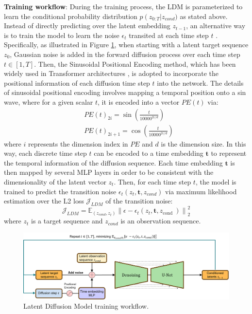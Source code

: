 \documentclass[final-report]{article-template}
\begin{document}
\textbf{Training workflow}: During the training process, the LDM is parameterized to learn the conditional probability distribution $p\left(z_{0: T}\right|z_{cond})$ as stated above. Instead of directly predicting over the latent embedding $z_{t-1}$, an alternative way is to train the model to learn the noise $\epsilon_t$ transited at each time step $t$ \cite{rombach2022highresolution, gao2024prediff}. Specifically, as illustrated in Figure \ref{fig:ldm_training}, when starting with a latent target sequence $z_0$, Gaussian noise is added in the forward diffusion process over each time step $t \in [1, T]$. Then, the Sinusoidal Positional Encoding method, which has been widely used in Transformer architectures \cite{vaswani2017attention}, is adopted to incorporate the positional information of each diffusion time step $t$ into the network. The details of sinusoidal positional encoding involves mapping a temporal position onto a sin wave, where for a given scalar $t$, it is encoded into a vector $PE(t)$ via:
\begin{align}
    &PE(t)_{2i} = \sin (\frac{t}{10000^{2i/d}}) \nonumber\\
    &PE(t)_{2i+1} = \cos (\frac{t}{10000^{2i/d}})
\end{align}
where $i$ represents the dimension index in $PE$ and $d$ is the dimension size. In this way, each discrete time step $t$ can be encoded to a time embedding $\mathbf{t}$ to represent the temporal information of the diffusion sequence. Each time embedding $\mathbf{t}$ is then mapped by several MLP layers in order to be consistent with the dimensionality of the latent vector $z_t$. Then, for each time step $t$, the model is trained to predict the transition noise $\epsilon_t(z_t, \mathbf{t}, z_{cond})$ via maximum likelihood estimation over the L2 loss $\mathcal{J}_{LDM}$ of the transition noise:
\begin{equation}
    \mathcal{J}_{LDM}=\mathbb{E}_{(z_{cond}, z_t)}\left\|\epsilon-\epsilon_t\left(z_t, \mathbf{t}, z_{\text {cond }}\right)\right\|^2_2
\end{equation}
where $z_t$ is a target sequence and $z_{cond}$ is an observation sequence. \\

\begin{figure}[htbp]
    \centering
    \includegraphics[width=16cm]{figures/ldm_training.png}
    \caption{Latent Diffusion Model training workflow.}
    \label{fig:ldm_training}
\end{figure}
\end{document}
